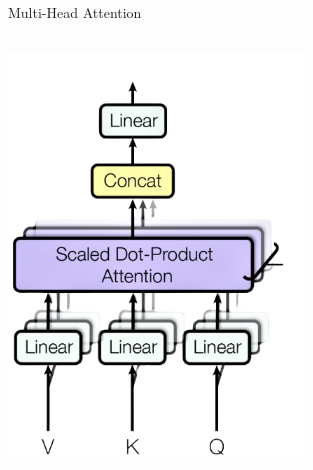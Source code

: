 \documentclass[serif, aspectratio=169]{beamer}
\begin{document}
\begin{frame}{Multi-Head Attention}
	
	
	
	    \begin{columns}[c]
		\centering
		\includegraphics[width=0.7\textwidth]{pic/multihead-attention-2.png}
		

\end{columns}
\end{frame}
\end{document}

